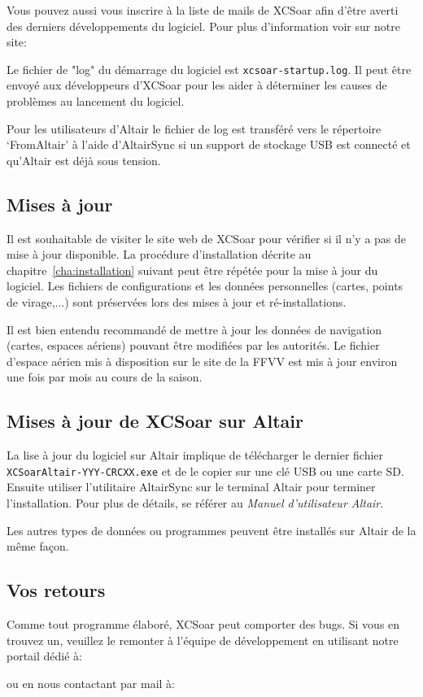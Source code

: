 Vous pouvez aussi vous inscrire à la liste de mails de XCSoar afin d'être averti des derniers développements du logiciel. Pour plus d'information voir sur notre site:
\begin{quote}
\end{quote}

Le fichier de "log" du démarrage du logiciel est \verb|xcsoar-startup.log|. Il peut être envoyé aux développeurs d'XCSoar pour les aider à déterminer les causes de problèmes au lancement du logiciel.

Pour les utilisateurs d'Altair le fichier de log est transféré vers le répertoire `FromAltair' à l'aide d'AltairSync si un support de stockage USB est connecté et qu'Altair est déjà sous tension.

\subsection*{Mises à jour}
Il est souhaitable de visiter le site web de XCSoar pour vérifier si il n'y a pas de mise à jour disponible. La procédure d'installation décrite au chapitre~\ref{cha:installation} suivant peut être répétée pour la mise à jour du logiciel. Les fichiers de configurations et les données personnelles (cartes, points de virage,...) sont préservées lors des mises à jour et ré-installations.

Il est bien entendu recommandé de mettre à jour les données de navigation (cartes, espaces aériens) pouvant être modifiées par les autorités. Le fichier d'espace aérien mis à disposition sur le site de la FFVV est mis à jour environ une fois par mois au cours de la saison.

\subsection*{Mises à jour de XCSoar sur Altair}
La lise à jour du logiciel sur Altair implique de télécharger le dernier fichier {\tt XCSoarAltair-YYY-CRCXX.exe} et de le copier sur une clé USB ou une carte SD. Ensuite utiliser l'utilitaire AltairSync sur le terminal Altair pour terminer l'installation. Pour plus de détails, se référer au {\em Manuel d'utilisateur Altair}.

Les autres types de données ou programmes peuvent être installés sur Altair de la même façon.

\subsection*{Vos retours}
Comme tout programme élaboré, XCSoar peut comporter des bugs. Si vous en trouvez un, veuillez le remonter à l'équipe de développement en utilisant notre portail dédié à:
\begin{quote}
\end{quote}
ou en nous contactant par mail à:

